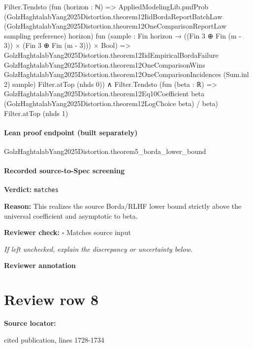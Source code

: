 \documentclass[10pt]{article}
\newcommand{\reviewerbox}{%
  \par\noindent\fbox{\parbox{0.96\linewidth}{\rule{0pt}{0.38in}}}\par
}
\newcommand{\reviewmatch}[1]{%
  \par\noindent\textbf{Reviewer check:} $\square$\; #1\par
  \noindent\emph{If left unchecked, explain the discrepancy or uncertainty below.}\par
}
\begin{document}
\begin{ReviewVerbatim}
                          Filter.Tendsto
                            (fun (horizon : ℕ) =>
                              AppliedModelingLib.pmfProb
                                (GolzHaghtalabYang2025Distortion.theorem12IidBordaReportBatchLaw
                                  (GolzHaghtalabYang2025Distortion.theorem12OneComparisonReportLaw sampling preference)
                                  horizon)
                                fun (sample : Fin horizon → ((Fin 3 ⊕ Fin (m - 3)) × (Fin 3 ⊕ Fin (m - 3))) × Bool) =>
                                GolzHaghtalabYang2025Distortion.theorem12IidEmpiricalBordaFailure
                                  GolzHaghtalabYang2025Distortion.theorem12OneComparisonWins
                                  GolzHaghtalabYang2025Distortion.theorem12OneComparisonIncidences (Sum.inl 2) sample)
                            Filter.atTop (nhds 0)) ∧
  Filter.Tendsto
    (fun (beta : ℝ) =>
      GolzHaghtalabYang2025Distortion.theorem12Eq10Coefficient beta
          (GolzHaghtalabYang2025Distortion.theorem12LogChoice beta) /
        beta)
    Filter.atTop (nhds 1)
\end{ReviewVerbatim}

\paragraph{Lean proof endpoint (built separately)}\begin{ReviewVerbatim}
GolzHaghtalabYang2025Distortion.theorem5_borda_lower_bound
\end{ReviewVerbatim}

\paragraph{Recorded source-to-Spec screening}
\textbf{Verdict:} \texttt{matches}
\\
{\raggedright
\textbf{Reason:} This realizes the source Borda/\allowbreak{}RLHF lower bound strictly above the universal coefficient and asymptotic to beta.\allowbreak{}
\par}
\reviewmatch{Matches source input}
\noindent\textbf{Reviewer annotation}\par
\reviewerbox
\clearpage
\hypertarget{source-claim-8c95df698cbd00a0}{}
\section*{Review row 8}
\textbf{Source locator:} {\footnotesize\raggedright cited publication, lines 1728-\allowbreak{}1734\par}
\end{document}
